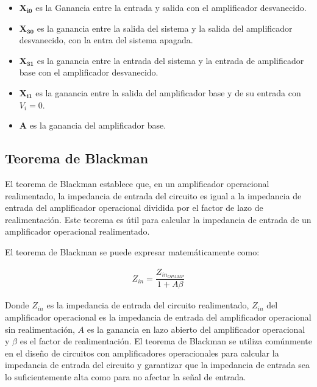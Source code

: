         \begin{itemize}
            \item $\mathbf{X_{i0}}$ es la Ganancia entre la entrada y salida con el amplificador desvanecido.

            \item  $\mathbf{X_{30}}$ es la ganancia entre la salida del sistema y la salida del amplificador desvanecido, con la entra del sistema apagada.

            \item  $\mathbf{X_{31}}$ es la ganancia entre la entrada del sistema y la entrada de amplificador base con el amplificador desvanecido.

            \item  $\mathbf{X_{i1}}$ es la ganancia entre la salida del amplificador base y de su entrada con $V_i= 0$.

            \item  \textbf{A} es la ganancia del amplificador base.

        \end{itemize}

    \subsection{Teorema de Blackman}

        El teorema de Blackman establece que, en un amplificador operacional realimentado, la impedancia de entrada del circuito es igual a la impedancia de entrada del amplificador operacional dividida por el factor de lazo de realimentación. Este teorema es útil para calcular la impedancia de entrada de un amplificador operacional realimentado. 
        
        El teorema de Blackman se puede expresar matemáticamente como:

        \begin{gather}
            Z_{in}=\dfrac{Z_{in_{OPAMP}}}{1+A\beta}
        \end{gather}

        Donde $Z_{in}$ es la impedancia de entrada del circuito realimentado, $Z_{in}$ del amplificador operacional es la impedancia de entrada del amplificador operacional sin realimentación, $A$ es la ganancia en lazo abierto del amplificador operacional y $\beta$ es el factor de realimentación. El teorema de Blackman se utiliza comúnmente en el diseño de circuitos con amplificadores operacionales para calcular la impedancia de entrada del circuito y garantizar que la impedancia de entrada sea lo suficientemente alta como para no afectar la señal de entrada. 
        
